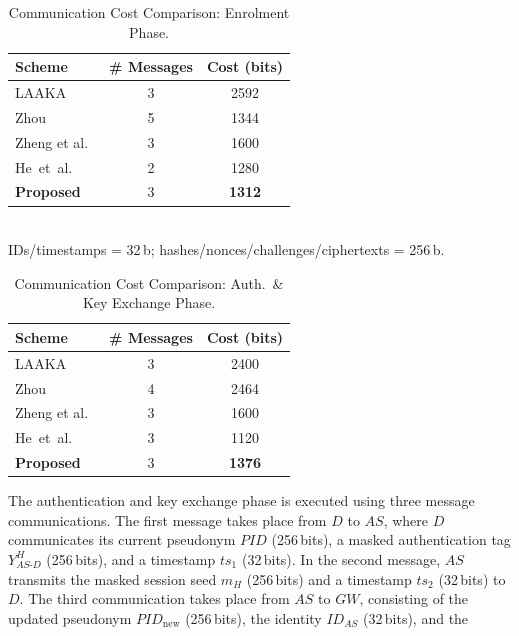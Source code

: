 \documentclass[conference]{IEEEtran}
\begin{document}
\begin{table}[!t]
  \centering
  \caption{Communication Cost Comparison: Enrolment Phase.}
  \label{tab:comm_enroll}
  \scriptsize
  \setlength{\tabcolsep}{3pt}
  \begin{tabular}{lcc}
    \toprule
    Scheme & \# Messages & Cost (bits) \\
    \midrule
    LAAKA~\cite{ali2024laaka}      & 3 & 2592 \\
    Zhou~\cite{zhou2024auth}      & 5 & 1344 \\
    Zheng et al.~\cite{zheng2022puf}      & 3 & 1600 \\
    He~et~al.~\cite{he2023lightweight}  & 2 & 1280 \\
    \textbf{Proposed}        & 3 & \textbf{1312} \\
    \bottomrule
  \end{tabular}\\[3pt]
  \scriptsize
  IDs/timestamps = 32\,b; hashes/nonces/challenges/ciphertexts = 256\,b.
\end{table}
\begin{table}[!t]
  \centering
  \caption{Communication Cost Comparison: Auth.\ \& Key Exchange Phase.}
  \label{tab:comm_auth}
  \scriptsize
  \setlength{\tabcolsep}{3pt}
  \begin{tabular}{lcc}
    \toprule
    Scheme & \# Messages & Cost (bits) \\
    \midrule
    LAAKA~\cite{ali2024laaka}      & 3 & 2400 \\
    Zhou~\cite{zhou2024auth}      & 4 & 2464 \\
    Zheng et al.~\cite{zheng2022puf}      & 3 & 1600 \\
    He~et~al.~\cite{he2023lightweight}  & 3 & 1120 \\
    \textbf{Proposed}        & 3 & \textbf{1376} \\
    \bottomrule
  \end{tabular}
\end{table}
The authentication and key exchange phase is executed using three message communications.
The first message takes place from $D$ to $AS$, where $D$ communicates its current
pseudonym $\mathit{PID}$ (256\,bits), a masked authentication tag $Y_{AS\text{-}D}^H$
(256\,bits), and a timestamp $ts_1$ (32\,bits). In the second message, $AS$ transmits the
masked session seed $m_H$ (256\,bits) and a timestamp $ts_2$ (32\,bits) to $D$. The
third communication takes place from $AS$ to $GW$, consisting of the updated pseudonym
$\mathit{PID}_{\mathrm{new}}$ (256\,bits), the identity $ID_{AS}$ (32\,bits), and the
\end{document}
